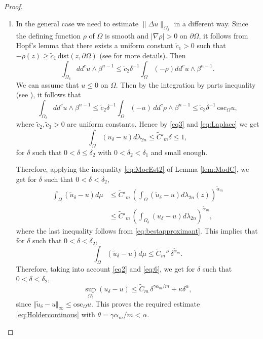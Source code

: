 \documentclass[11pt]{article}
\numberwithin{equation}{section}
\theoremstyle{definition}
\theoremstyle{plain}
\theoremstyle{definition}
\begin{document}
\begin{proof}
\begin{enumerate}
\item
In the general case we need to estimate $\|\Delta u\|_{\Omega_\delta}$ in a different way. Since the defining function $\rho$ of $\Omega$ is smooth and $\vert \nabla \rho \vert > 0$ on $\partial \Omega$, it follows from Hopf's lemma that there exists a uniform constant $\tilde c_1 > 0$ such that $- \rho (z) \geq \tilde c_1 \, \text{dist} (z, \partial \Omega)$ (see \cite{Ze20} for more details). Then
\[
\int_{\Omega_\delta} dd^c u \wedge \beta^{n-1} \leq \tilde c_2 \delta^{-1} \int_{\Omega} (- \rho) dd^c u \wedge \beta^{n-1}.
\]
We can assume that $u \leq 0$ on $\Omega$. Then by the integration by parts inequality (see \cite[(2.5)]{BZ20}), it follows that
\begin{equation} \label{eq:Laplace}
\int_{\Omega_\delta} dd^c u \wedge \beta^{n-1} \leq \tilde c_2 \delta^{-1} \int_{\Omega} (- u) \, dd^c \rho \wedge \beta^{n-1}\leq \tilde c_3 \delta^{-1} \, \text{osc}_{\Omega} u,
\end{equation}
where $\tilde c_2, \tilde c_3 > 0$ are uniform constants. Hence by \eqref{eq3} and \eqref{eq:Laplace} we get
\begin{equation*} \label{eq5}
\int_{\Omega}({u}_{\delta}-u)d\lambda_{2n} \leq {\tilde C}'_m \delta \leq 1,
\end{equation*}
for $\delta$ such that $0 < \delta \leq \delta_2$ with $0 < \delta_2 < \delta_1$ and small enough.

Therefore, applying the inequality \eqref{eq:MocEst2} of Lemma \ref{lem:ModC}, we get for $\delta$ such that $0 < \delta < \delta_2$,
\begin{align*}
\int_{\Omega}(\tilde{u}_{\delta}-u)d\mu & \leq \tilde C'_m \, \left(\int_{\Omega}(\tilde{u}_{\delta}-u) d\lambda_{2 n} (z)\right)^{\tilde \alpha_m} \\
&\leq \tilde C'_m \, \left(\int_{\Omega_{\delta}}({u}_{\delta}-u)d\lambda_{2 n} \right)^{\tilde \alpha_m},
\end{align*}
where the last inequality follows from \eqref{eq:bestapproximant}. This implies that for $\delta$ such that \hbox{$0\!<\!\delta\!<\!\delta_2$},
\begin{equation} \label{eq:6}
\int_{\Omega}(\tilde{u}_{\delta}-u)d\mu \leq \tilde C_m'' \, \delta^{\tilde \alpha_m}.
\end{equation}
Therefore, taking into account \eqref{eq2} and \eqref{eq:6}, we get for $\delta$ such that $0 < \delta < \delta_2$,
\[
\sup_{\Omega_{\delta}} ({u}_{\delta}-u) \leq \tilde C_m \, \delta^{\gamma\alpha_m \slash m} + \kappa \delta^{\alpha},
\]
since $\Vert \tilde u_{\delta} - u\Vert_{\infty}\!\leq\!\text{osc}_{\Omega} u$.
This proves the required estimate \eqref{eq:Holdercontinous} with \hbox{$\theta\!=\!\gamma\alpha_m/m\!<\!\alpha$}.\qedhere
\end{enumerate}
\end{proof}
\end{document}
